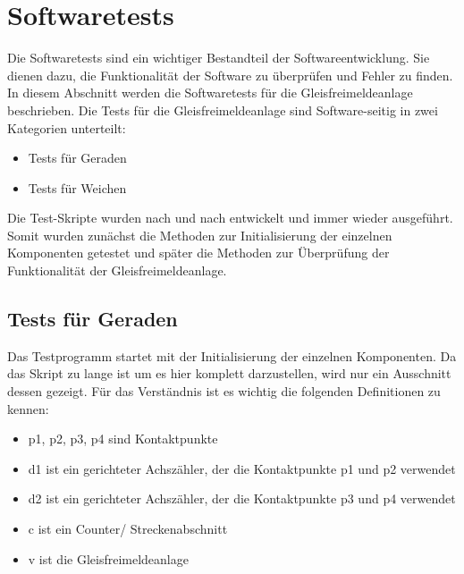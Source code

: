 \section{Softwaretests}\label{text:Entwicklung-der-GFA:Softwaretests}

Die Softwaretests sind ein wichtiger Bestandteil der Softwareentwicklung. Sie dienen dazu, die Funktionalität der Software zu überprüfen und Fehler zu finden. In diesem Abschnitt werden die Softwaretests für die Gleisfreimeldeanlage beschrieben.\newline
Die Tests für die Gleisfreimeldeanlage sind Software-seitig in zwei Kategorien unterteilt:
\begin{itemize}
    \item Tests für Geraden
    \item Tests für Weichen
\end{itemize}
Die Test-Skripte wurden nach und nach entwickelt und immer wieder ausgeführt. Somit wurden zunächst die Methoden zur Initialisierung der einzelnen Komponenten getestet und später die Methoden zur Überprüfung der Funktionalität der Gleisfreimeldeanlage.

\subsection{Tests für Geraden}\label{text:Entwicklung-der-GFA:Softwaretests:Tests-für-Geraden}

Das Testprogramm startet mit der Initialisierung der einzelnen Komponenten. Da das Skript zu lange ist um es hier komplett darzustellen, wird nur ein Ausschnitt dessen gezeigt. Für das Verständnis ist es wichtig die folgenden Definitionen zu kennen:
\begin{itemize}
    \item p1, p2, p3, p4 sind Kontaktpunkte
    \item d1 ist ein gerichteter Achszähler, der die Kontaktpunkte p1 und p2 verwendet
    \item d2 ist ein gerichteter Achszähler, der die Kontaktpunkte p3 und p4 verwendet
    \item c ist ein Counter/ Streckenabschnitt
    \item v ist die Gleisfreimeldeanlage
\end{itemize}

